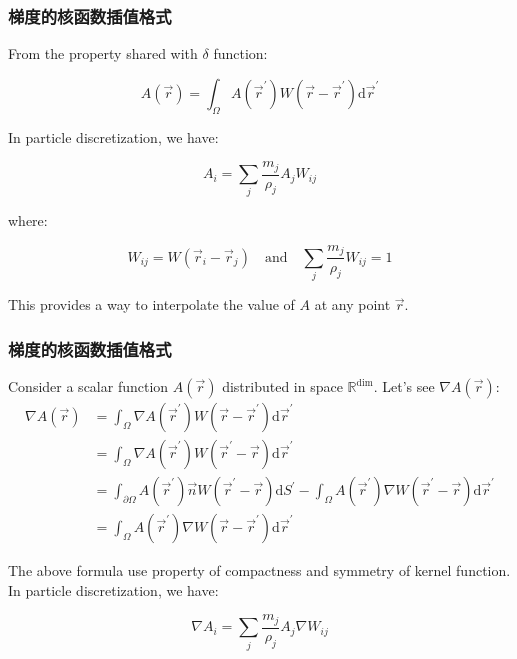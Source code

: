 \begin{frame}
    \frametitle{梯度的核函数插值格式}
    From the property shared with $\delta$ function:

\begin{equation}
    A(\vec{r}) = 
    \int_{\Omega} A(\vec{r}^\prime) 
    W(\vec{r} - \vec{r}^\prime) \mathrm{d}\vec{r}^\prime
\end{equation}

In particle discretization, we have:

\begin{equation}
    A_i = \sum_{j} \frac{m_j}{\rho_j} A_j W_{ij}
\end{equation}

where:

\begin{equation}
    W_{ij} = W(\vec{r}_i - \vec{r}_j)\quad \text{and} 
    \quad \sum_{j} \frac{m_j}{\rho_j} W_{ij} = 1
\end{equation}

This provides a way to interpolate the value of $A$ at any point $\vec{r}$.
\end{frame}

\begin{frame}
    \frametitle{梯度的核函数插值格式}
    Consider a scalar function $A(\vec{r})$ distributed in space $\mathbb{R}^\text{dim}$. 
Let's see $\nabla A(\vec{r})$:
\begin{equation}
    \begin{aligned}
        \nabla A(\vec{r}) 
        &= \int_{\Omega} \nabla A(\vec{r}^\prime) W(\vec{r} - \vec{r}^\prime) \mathrm{d}\vec{r}^\prime \\
        &= \int_{\Omega} \nabla A(\vec{r}^\prime) W(\vec{r}^\prime - \vec{r}) \mathrm{d}\vec{r}^\prime \\
        &= \int_{\partial \Omega} A(\vec{r}^\prime) \vec{n} W(\vec{r}^\prime - \vec{r}) \mathrm{d}S^\prime
        -\int_{\Omega} A(\vec{r}^\prime) \nabla W(\vec{r}^\prime - \vec{r}) \mathrm{d}\vec{r}^\prime\\
        &= \int_{\Omega} A(\vec{r}^\prime) \nabla W(\vec{r} - \vec{r}^\prime) \mathrm{d}\vec{r}^\prime
    \end{aligned}
\end{equation}

The above formula use property of compactness and symmetry of kernel function. 
In particle discretization, we have:

\begin{equation}
    \nabla A_i = \sum_{j} \frac{m_j}{\rho_j} A_j \nabla W_{ij}
\end{equation}
\end{frame}

